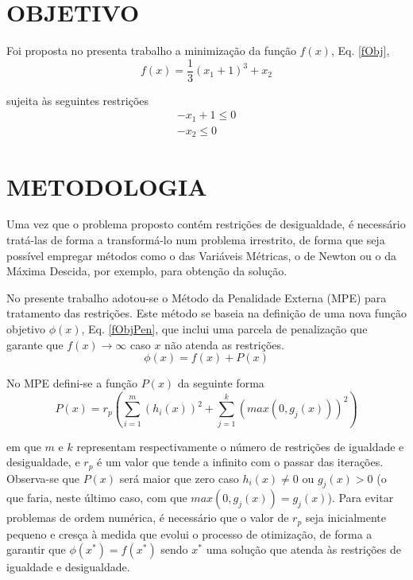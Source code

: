 \documentclass[12pt]{article}
\begin{document}
	\section{OBJETIVO}
		Foi proposta no presenta trabalho a minimização da função $ f(x) $, Eq. \ref{fObj},
		\begin{equation}
			f(x) = \frac{1}{3}(x_1 + 1)^3 + x_2
			\label{fObj}
		\end{equation}
		
		sujeita às seguintes restrições
		\begin{gather}
			-x_1 + 1 \leq 0 \\
			-x_2 \leq 0
		\end{gather}
		
	\section{METODOLOGIA}
		Uma vez que o problema proposto contém restrições de desigualdade, é necessário tratá-las de forma a transformá-lo num problema irrestrito, de forma que seja possível empregar métodos como o das Variáveis Métricas, o de Newton ou o da Máxima Descida, por exemplo, para obtenção da solução. 
		
		No presente trabalho adotou-se o Método da Penalidade Externa (MPE) para tratamento das restrições. Este método se baseia na definição de uma nova função objetivo $ \phi(x) $, Eq. \ref{fObjPen}, que inclui uma parcela de penalização que garante que $ f(x) \rightarrow \infty $ caso $ x $ não atenda as restrições. 
		\begin{equation}
			\label{fObjPen}
			\phi(x) = f(x) + P(x)
		\end{equation}
		
		No MPE defini-se a função $ P(x) $ da seguinte forma
		\begin{equation}
			P(x) = r_p (\sum_{i = 1}^{m}(h_i(x))^2 + \sum_{j = 1}^{k} (max(0, g_j(x)))^2)
		\end{equation}		 
		
		\noindent em que $ m $ e $ k $ representam respectivamente o número de restrições de igualdade e desigualdade, e $ r_p $ é um valor que tende a infinito com o passar das iterações. Observa-se que $ P(x) $ será maior que zero caso $ h_i(x) \neq 0 $ ou $ g_j(x) > 0 $ (o que faria, neste último caso, com que $ max(0, g_j(x)) = g_j(x)$). Para evitar problemas de ordem numérica, é necessário que o valor de $ r_p $ seja inicialmente pequeno e cresça à medida que evolui o processo de otimização, de forma a garantir que $ \phi(x^*) = f(x^*) $ sendo $ x^* $ uma solução que atenda às restrições de igualdade e desigualdade.
		
\end{document}
